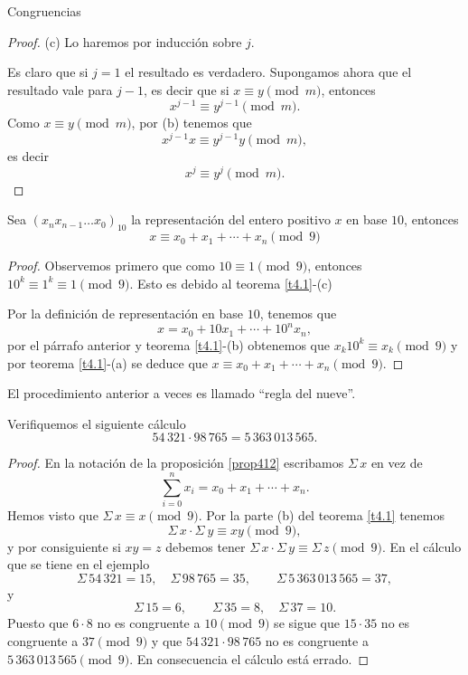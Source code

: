 \begin{section}{Congruencias}
\begin{proof}
\noindent (c)  Lo haremos por inducción sobre $j$. 

Es claro que si $j=1$ el resultado es verdadero. Supongamos ahora que el resultado vale para $j-1$, es decir que si  $x \equiv y \pmod{m}$, entonces 
$$
x^{j-1} \equiv y^{j-1} \pmod{m}.
$$
Como $x \equiv y \pmod{m}$,  por   { (b)} tenemos que 
$$
x^{j-1}x \equiv y^{j-1}y  \pmod{m},
$$
es decir 
$$
x^j \equiv y^j \pmod{m}.
$$
\end{proof}


\begin{proposicion}\label{prop412}
Sea $(x_nx_{n-1}\ldots x_0)_{10}$ la
representación del entero positivo $x$ en base $10$, entonces
$$
x \equiv x_0+x_1+\cdots+x_n \pmod{9}
$$
\end{proposicion}
\begin{proof}
 Observemos primero que como $10\equiv 1\pmod{9}$, entonces  $10^k\equiv 1^k \equiv 1\pmod{9}$. Esto es debido  al teorema \ref{t4.1}-{(c)} 

Por la definición de representación en base $10$, tenemos que 
$$x=x_0 + 10x_1+ \cdots+10^nx_n,$$ 
por el párrafo anterior y teorema \ref{t4.1}-{(b)}  obtenemos que $x_k10^k \equiv x_k \pmod{9}$ y por
teorema \ref{t4.1}-{(a)} se deduce que $x \equiv
x_0+x_1+\cdots+x_n \pmod{9}$.
\end{proof}

El procedimiento anterior a veces es llamado ``regla del nueve''.

\begin{ejemplo} Verifiquemos  el siguiente cálculo
$$
54\,321 \cdot 98\,765= 5\,363\,013\,565.
$$
\end{ejemplo}
\begin{proof}
En la notación de la proposición \ref{prop412} escribamos $\Sigma\, x$ en vez de $$\sum_{i=0}^n x_i = x_0+x_1+\cdots+x_n.$$
Hemos visto que $\Sigma\, x \equiv x \pmod{9}$. Por la parte (b) del
teorema \ref{t4.1} tenemos
$$
\Sigma\, x \cdot\Sigma\ y \equiv xy \pmod{9},
$$
y por consiguiente si $xy=z$ debemos tener $\Sigma\, x \cdot \Sigma\, y \equiv\Sigma\, z \pmod{9}$. 
En el cálculo que se tiene en el ejemplo
$$
\Sigma\, 54\,321=15,\quad \Sigma\, 98\,765=35,\qquad \Sigma\, 5\,363\,013\,565=37,
$$
y
$$
\Sigma\, 15=6, \qquad \Sigma\, 35=8,\quad \Sigma\, 37=10.
$$
Puesto que $6 \cdot 8$ no es congruente a $10 \pmod{9}$ se sigue
que $15 \cdot 35$ no es congruente a $37 \pmod{9}$ y que $54\,321
\cdot 98\,765$ no es congruente a $5\,363\,013\,565\pmod{9}$. En
consecuencia el cálculo está errado.
\end{proof}


\end{section}
